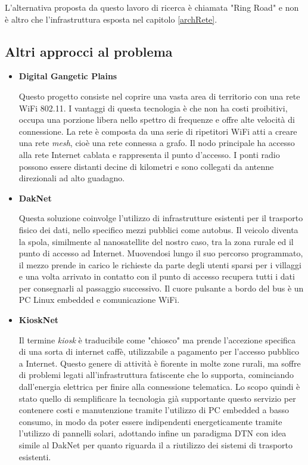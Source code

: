 \documentclass[12pt,a4paper,oneside]{book}
\begin{document}
			L'alternativa proposta da questo lavoro di ricerca è chiamata "Ring Road" \cite{burleigh2011toward} e non è altro che l'infrastruttura esposta nel capitolo \ref{archRete}.
				
			\subsection{Altri approcci al problema}
			
			\begin{itemize}
				\item {\bf Digital Gangetic Plains \cite{raman2007experiences}}
				
				Questo progetto consiste nel coprire una vasta area di territorio con una rete WiFi 802.11. I vantaggi di questa tecnologia è che non ha costi proibitivi, occupa una porzione libera nello spettro di frequenze e offre alte velocità di connessione. La rete è composta da una serie di ripetitori WiFi atti a creare una rete {\it mesh}, cioè una rete connessa a grafo. Il nodo principale ha accesso alla rete Internet cablata e rappresenta il punto d'accesso. I ponti radio possono essere distanti decine di kilometri e sono collegati da antenne direzionali ad alto guadagno. 
				
				\item {\bf DakNet \cite{hasson2003daknet}}
				
				Questa soluzione coinvolge l'utilizzo di infrastrutture esistenti per il trasporto fisico dei dati, nello specifico mezzi pubblici come autobus. Il veicolo diventa la spola, similmente al nanosatellite del nostro caso, tra la zona rurale ed il punto di accesso ad Internet. Muovendosi lungo il suo percorso programmato, il mezzo prende in carico le richieste da parte degli utenti sparsi per i villaggi e una volta arrivato in contatto con il punto di accesso recupera tutti i dati per consegnarli al passaggio successivo. Il cuore pulsante a bordo del bus è un PC Linux embedded e comunicazione WiFi. 
				
				\item {\bf KioskNet \cite{seth2006low}}
				
				Il termine {\it kiosk} è traducibile come "chiosco" ma prende l'accezione specifica di una sorta di internet caffè, utilizzabile a pagamento per l'accesso pubblico a Internet. Questo genere di attività è fiorente in molte zone rurali, ma soffre di problemi legati all'infrastruttura fatiscente che lo supporta, cominciando dall'energia elettrica per finire alla connessione telematica. Lo scopo quindi è stato quello di semplificare la tecnologia già supportante questo servizio per contenere costi e manutenzione tramite l'utilizzo di PC embedded a basso consumo, in modo da poter essere indipendenti energeticamente tramite l'utilizzo di pannelli solari, adottando infine un paradigma DTN con idea simile al DakNet per quanto riguarda il a riutilizzo dei sistemi di trasporto esistenti.
								
			\end{itemize}
			
\end{document}
